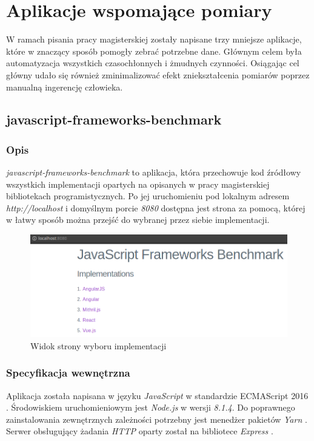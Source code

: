 \documentclass[polish, twoside, 12pt]{mwart}
\let\stdsection\section
\renewcommand*{\section}{\clearpage\stdsection}
\begin{document}
\section{Aplikacje wspomające pomiary} \label{utils}

W ramach pisania pracy magisterskiej zostały napisane trzy mniejsze aplikacje, które w znaczący sposób pomogły zebrać potrzebne dane. Głównym celem była automatyzacja wszystkich czasochłonnych i żmudnych czynności. Osiągając cel główny udało się również zminimalizować efekt zniekształcenia pomiarów poprzez manualną ingerencję człowieka.

\subsection{javascript-frameworks-benchmark}

\subsubsection{Opis}

\emph{javascript-frameworks-benchmark} to aplikacja, która przechowuje kod źródłowy wszystkich implementacji opartych na opisanych w pracy magisterskiej bibliotekach programistycznych. Po jej uruchomieniu pod lokalnym adresem \emph{http://localhost} i domyślnym porcie \emph{8080} dostępna jest strona za pomocą, której w łatwy sposób można przejść do wybranej przez siebie implementacji.

\begin{figure}[ht]
  \includegraphics[width=\textwidth]{javascript-frameworks-benchmark.png}
	\caption{Widok strony wyboru implementacji}
\end{figure}

\subsubsection{Specyfikacja wewnętrzna}

Aplikacja została napisana w języku \emph{JavaScript} w standardzie ECMAScript 2016 \cite{es2016}. Środowiskiem uruchomieniowym jest \emph{Node.js} \cite{node.js} w wersji \emph{8.1.4}. Do poprawnego zainstalowania zewnętrznych zależności potrzebny jest menedżer pakietów \emph{Yarn} \cite{yarn}. Serwer obsługujący żadania \emph{HTTP} oparty został na bibliotece \emph{Express} \cite{express}.
\end{document}
